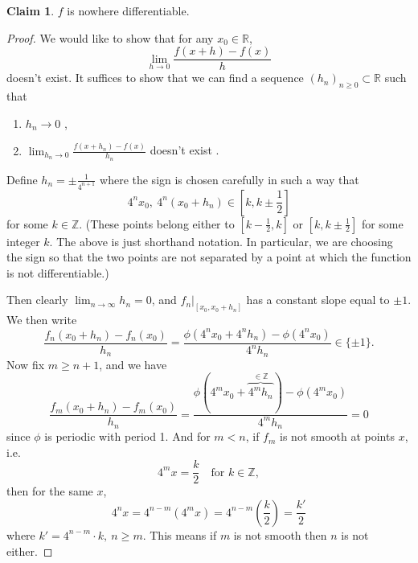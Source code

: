 \documentclass[a4paper]{article}
\theoremstyle{definition}
\newtheorem*{claim}{Claim}
\begin{document}
\begin{claim}
$f$ is nowhere differentiable.
\end{claim}
\begin{proof}
We would like to show that for any $x_0 \in \mathbb R$,
\[
\lim_{h\rightarrow 0} \frac{f(x+h)-f(x)}{h}
\]
doesn't exist. It suffices to show that we can find a sequence $(h_n)_{n\geq 0} \subset \mathbb R$ such that
\begin{enumerate}
    \item $h_n \rightarrow 0$ ,
    \item $\displaystyle \lim_{h_n\rightarrow 0} \frac{f(x+h_n)-f(x)}{h_n}$ doesn't exist .
\end{enumerate}
Define $\displaystyle h_n=\pm \frac{1}{4^{n+1}}$ where the sign is chosen carefully in such a way that
\[
4^n x_0,\ 4^n (x_0+h_n) \in \left[ k,k\pm \frac12 \right]
\]
for some $k\in \mathbb Z$. (These points belong either to $\left[ k- \frac12 ,k \right]$ or $\left[ k,k\pm \frac12 \right]$ for some integer $k$. The above is just shorthand notation. In particular, we are choosing the sign so that the two points are not separated by a point at which the function is not differentiable.)
\begin{center}
\end{center}
Then clearly $\displaystyle \lim_{n\rightarrow \infty} h_n = 0$, and $\displaystyle f_n\left. \right|_{[x_0,x_0+h_n]}$ has a constant slope equal to $\pm 1$. We then write
\begin{equation}
\frac{f_n(x_0+h_n)-f_n(x_0)}{h_n} = \frac{\phi (4^n x_0+4^n h_n)-\phi (4^n x_0)}{4^n h_n} \in \{\pm 1\}.
\end{equation}
Now fix $m \geq n+1$, and we have
\begin{equation}
\frac{f_m(x_0+h_n)-f_m(x_0)}{h_n} = \frac{\phi (4^m x_0+\overbrace{4^m h_n}^{\in \mathbb Z})-\phi (4^m x_0)}{4^m h_n} =0
\end{equation}
since $\phi$ is periodic with period 1. And for $m<n$,
if $f_m$ is not smooth at points $x$, i.e.
\[
4^m x = \frac{k}{2} \quad \text{for }k\in \mathbb Z,
\]
then for the same $x$,
\[
4^n x = 4^{n-m} (4^m x) = 4^{n-m} \left( \frac{k}{2} \right) = \frac{k'}{2}
\]
where $k'=4^{n-m}\cdot k,\ n\geq m$. This means if $m$ is not smooth then $n$ is not either.


\end{proof}
\end{document}
